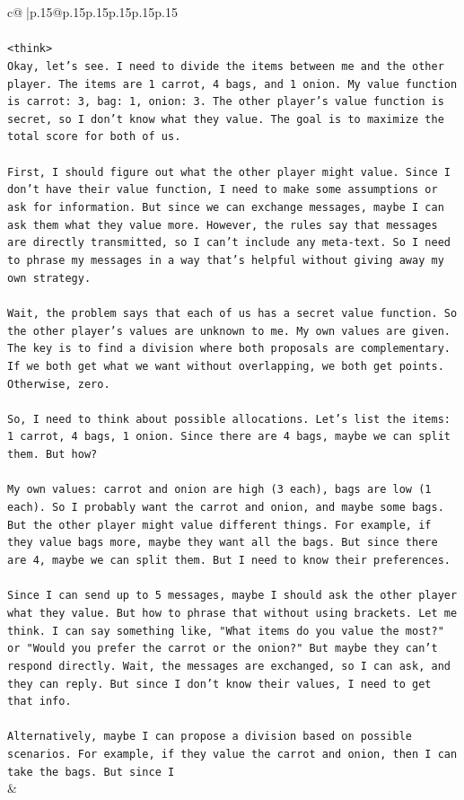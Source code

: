 \documentclass{article}
\begin{document}
{\begin{supertabular}{c@{$\;$}|p{.15\linewidth}@{}p{.15\linewidth}p{.15\linewidth}p{.15\linewidth}p{.15\linewidth}p{.15\linewidth}}
{{{\\ 
\\ 
\texttt{<think>} \\
\texttt{Okay, let's see. I need to divide the items between me and the other player. The items are 1 carrot, 4 bags, and 1 onion. My value function is carrot: 3, bag: 1, onion: 3. The other player's value function is secret, so I don't know what they value. The goal is to maximize the total score for both of us.} \\
\\ 
\texttt{First, I should figure out what the other player might value. Since I don't have their value function, I need to make some assumptions or ask for information. But since we can exchange messages, maybe I can ask them what they value more. However, the rules say that messages are directly transmitted, so I can't include any meta{-}text. So I need to phrase my messages in a way that's helpful without giving away my own strategy.} \\
\\ 
\texttt{Wait, the problem says that each of us has a secret value function. So the other player's values are unknown to me. My own values are given. The key is to find a division where both proposals are complementary. If we both get what we want without overlapping, we both get points. Otherwise, zero.} \\
\\ 
\texttt{So, I need to think about possible allocations. Let's list the items: 1 carrot, 4 bags, 1 onion. Since there are 4 bags, maybe we can split them. But how?} \\
\\ 
\texttt{My own values: carrot and onion are high (3 each), bags are low (1 each). So I probably want the carrot and onion, and maybe some bags. But the other player might value different things. For example, if they value bags more, maybe they want all the bags. But since there are 4, maybe we can split them. But I need to know their preferences.} \\
\\ 
\texttt{Since I can send up to 5 messages, maybe I should ask the other player what they value. But how to phrase that without using brackets. Let me think. I can say something like, "What items do you value the most?" or "Would you prefer the carrot or the onion?" But maybe they can't respond directly. Wait, the messages are exchanged, so I can ask, and they can reply. But since I don't know their values, I need to get that info.} \\
\\ 
\texttt{Alternatively, maybe I can propose a division based on possible scenarios. For example, if they value the carrot and onion, then I can take the bags. But since I} \\
            }
        }
    }
    & \\ \\


\end{supertabular}}
\end{document}

